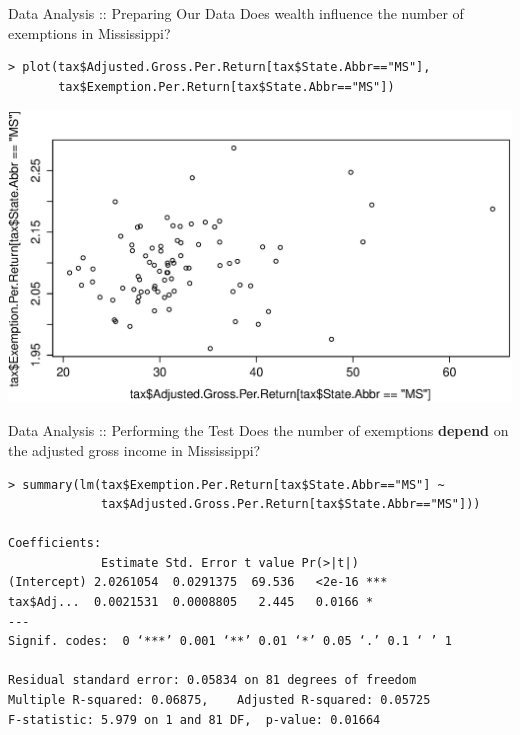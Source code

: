 \documentclass{beamer}
\begin{document}
\begin{frame}[fragile]{Data Analysis :: Preparing Our Data}
Does wealth influence the number of exemptions in Mississippi?

\begin{footnotesize}
\begin{verbatim}
> plot(tax$Adjusted.Gross.Per.Return[tax$State.Abbr=="MS"],
       tax$Exemption.Per.Return[tax$State.Abbr=="MS"])
\end{verbatim}
\end{footnotesize}

\includegraphics[scale=0.2]{income_v_exemptions_ms.eps}

\end{frame}

\begin{frame}[fragile]{Data Analysis :: Performing the Test}
Does the number of exemptions \textbf{depend} on the adjusted gross income in Mississippi?

\begin{footnotesize}
\begin{verbatim}
> summary(lm(tax$Exemption.Per.Return[tax$State.Abbr=="MS"] ~
             tax$Adjusted.Gross.Per.Return[tax$State.Abbr=="MS"]))

Coefficients:
             Estimate Std. Error t value Pr(>|t|)    
(Intercept) 2.0261054  0.0291375  69.536   <2e-16 ***
tax$Adj...  0.0021531  0.0008805   2.445   0.0166 *  
---
Signif. codes:  0 ‘***’ 0.001 ‘**’ 0.01 ‘*’ 0.05 ‘.’ 0.1 ‘ ’ 1 

Residual standard error: 0.05834 on 81 degrees of freedom
Multiple R-squared: 0.06875,    Adjusted R-squared: 0.05725 
F-statistic: 5.979 on 1 and 81 DF,  p-value: 0.01664
\end{verbatim}
\end{footnotesize}

\end{frame}
\end{document}

